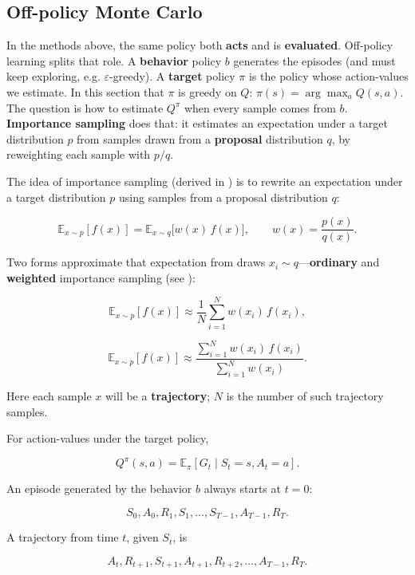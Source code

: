 


\subsection{Off-policy Monte Carlo}

In the methods above, the same policy both \textbf{acts} and is \textbf{evaluated}. Off-policy learning splits that role. A \textbf{behavior} policy $b$ generates the episodes (and must keep exploring, e.g. $\varepsilon$-greedy). A \textbf{target} policy $\pi$ is the policy whose action-values we estimate. In this section that $\pi$ is greedy on $Q$: $\pi(s)=\arg\max_a Q(s,a)$. The question is how to estimate $Q^\pi$ when every sample comes from $b$. \textbf{Importance sampling} does that: it estimates an expectation under a target distribution $p$ from samples drawn from a \textbf{proposal} distribution $q$, by reweighting each sample with $p/q$.

The idea of importance sampling (derived in ) is to rewrite an expectation under a target distribution $p$ using samples from a proposal distribution $q$:

\[
\mathbb{E}_{x\sim p}[f(x)]
=
\mathbb{E}_{x\sim q}\bigl[w(x)\, f(x)\bigr],
\qquad
w(x)=\frac{p(x)}{q(x)}.
\]

Two forms approximate that expectation from draws $x_i\sim q$---\textbf{ordinary} and \textbf{weighted} importance sampling (see ):

\[
\mathbb{E}_{x\sim p}[f(x)]
\approx
\frac{1}{N}\sum_{i=1}^{N} w(x_i)\, f(x_i),
\]

\[
\mathbb{E}_{x\sim p}[f(x)]
\approx
\frac{\sum_{i=1}^{N} w(x_i)\, f(x_i)}{\sum_{i=1}^{N} w(x_i)}.
\]

Here each sample $x$ will be a \textbf{trajectory}; $N$ is the number of such trajectory samples.

For action-values under the target policy,

\begin{equation}
Q^\pi(s,a)
=
\mathbb{E}_\pi[G_t\mid S_t=s,A_t=a].
\tag{4.8}
\end{equation}

An episode generated by the behavior $b$ always starts at $t=0$:

\[
S_0,A_0,R_1,S_1,\ldots,S_{T-1},A_{T-1},R_T.
\]

A trajectory from time $t$, given $S_t$, is

\[
A_t,R_{t+1},S_{t+1},A_{t+1},R_{t+2},\ldots,A_{T-1},R_T.
\]

